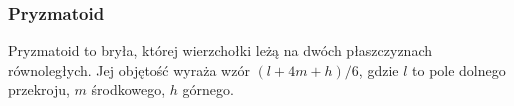 
\subsubsection{Pryzmatoid}
Pryzmatoid to bryła, której wierzchołki leżą na dwóch płaszczyznach równoległych.
Jej objętość wyraża wzór $(l + 4m + h)/ 6$, gdzie $l$ to pole dolnego przekroju, $m$ środkowego, $h$ górnego. %

